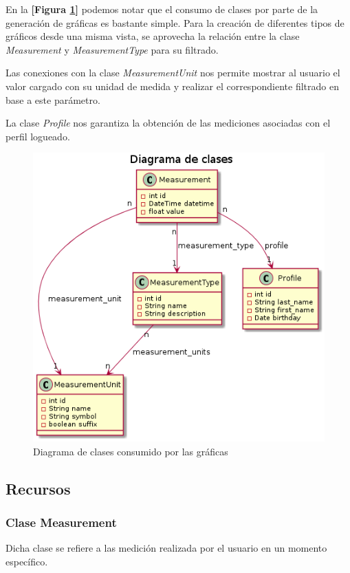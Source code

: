 En la \textbf{[Figura \ref{5-clases-graficas}]} podemos notar que el consumo de clases por parte de la generación de gráficas es bastante simple. Para la creación de diferentes tipos de gráficos desde una misma vista, se aprovecha la relación entre la clase \textit{Measurement} y \textit{MeasurementType} para su filtrado.

Las conexiones con la clase \textit{MeasurementUnit} nos permite mostrar al usuario el valor cargado con su unidad de medida y realizar el correspondiente filtrado en base a este parámetro.

La clase \textit{Profile} nos garantiza la obtención de las mediciones asociadas con el perfil logueado.

\begin{figure}[h!]
	\centering
	\includegraphics[width=.8\textwidth]{img/5-clases-graficas}
	\caption{Diagrama de clases consumido por las gráficas}
	\label{5-clases-graficas}
\end{figure}


\subsection{Recursos}
 
\subsubsection{Clase Measurement} 
Dicha clase se refiere a las medición realizada por el usuario en un momento específico. 

